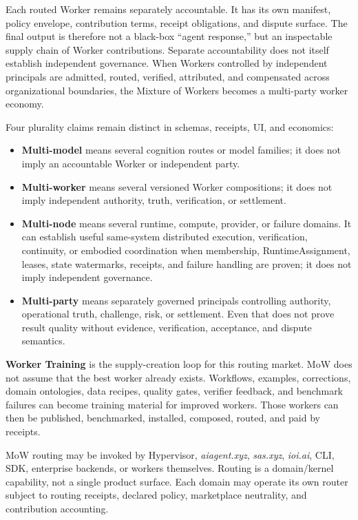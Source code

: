 \documentclass[
  11pt,
]{article}
\providecommand{\tightlist}{%
  \setlength{\itemsep}{0pt}\setlength{\parskip}{0pt}}
\begin{document}
Each routed Worker remains separately accountable. It has its own
manifest, policy envelope, contribution terms, receipt obligations, and
dispute surface. The final output is therefore not a black-box ``agent
response,'' but an inspectable supply chain of Worker contributions.
Separate accountability does not itself establish independent governance.
When Workers controlled by independent principals are admitted, routed,
verified, attributed, and compensated across organizational boundaries,
the Mixture of Workers becomes a multi-party worker economy.

Four plurality claims remain distinct in schemas, receipts, UI, and
economics:

\begin{itemize}
\tightlist
\item
  \textbf{Multi-model} means several cognition routes or model families;
  it does not imply an accountable Worker or independent party.
\item
  \textbf{Multi-worker} means several versioned Worker compositions; it
  does not imply independent authority, truth, verification, or settlement.
\item
  \textbf{Multi-node} means several runtime, compute, provider, or failure
  domains. It can establish useful same-system distributed execution,
  verification, continuity, or embodied coordination when membership,
  RuntimeAssignment, leases, state watermarks, receipts, and failure handling
  are proven; it does not imply independent governance.
\item
  \textbf{Multi-party} means separately governed principals controlling
  authority, operational truth, challenge, risk, or settlement. Even that
  does not prove result quality without evidence, verification,
  acceptance, and dispute semantics.
\end{itemize}

\textbf{Worker Training} is the supply-creation loop for this routing
market. MoW does not assume that the best worker already exists.
Workflows, examples, corrections, domain ontologies, data recipes,
quality gates, verifier feedback, and benchmark failures can become
training material for improved workers. Those workers can then be
published, benchmarked, installed, composed, routed, and paid by
receipts.

MoW routing may be invoked by Hypervisor, \emph{aiagent.xyz},
\emph{sas.xyz}, \emph{ioi.ai}, CLI, SDK, enterprise backends, or workers
themselves. Routing is a domain/kernel capability, not a single product
surface. Each domain may operate its own router subject to routing
receipts, declared policy, marketplace neutrality, and contribution
accounting.
\end{document}
